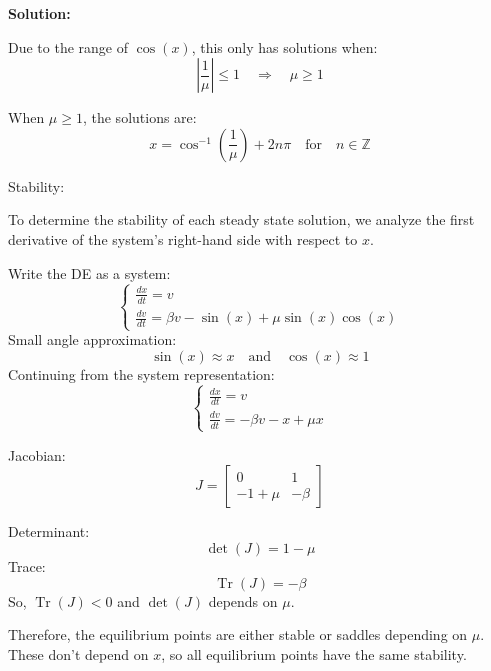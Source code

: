 \documentclass[12pt]{article}
\DeclareMathOperator{\Tr}{Tr}
\newenvironment{solution}{
    \textbf{Solution:}
    
}{
    
    \vspace{2em}
}
\begin{document}
\begin{solution}
       Due to the range of \(\cos(x)\), this only has solutions when:
       \[
       \left| \frac{1}{\mu} \right| \leq 1 \quad \Rightarrow \quad \mu \geq 1
       \]
       
       When \(\mu \geq 1\), the solutions are:
       \[
       x = \cos^{-1}\left( \frac{1}{\mu} \right) + 2n\pi \quad \text{for} \quad n \in \mathbb{Z}
       \]
    
    Stability:
    
    To determine the stability of each steady state solution, we analyze the first derivative of the system's right-hand side with respect to \( x \).
    
    Write the DE as a system:
    \[
    \begin{cases}
    \frac{dx}{dt} = v \\
    \frac{dv}{dt} = \beta v - \sin(x) + \mu \sin(x) \cos(x)
    \end{cases}
    \]
    Small angle approximation:
    \[
    \sin(x) \approx x \quad \text{and} \quad \cos(x) \approx 1
    \]
    Continuing from the system representation:
    \[
    \begin{cases}
    \frac{dx}{dt} = v \\
    \frac{dv}{dt} = -\beta v - x + \mu x
    \end{cases}
    \]
    
    Jacobian:
    \[
      J = \begin{bmatrix}
        0 & 1 \\
        -1 + \mu & -\beta
        \end{bmatrix}
    \]
    
    Determinant:
        \[
        \det(J) = 1 - \mu
        \]
        Trace:
        \[
        \Tr(J) = -\beta
        \]
        So, \(\Tr(J) < 0\) and \(\det(J)\) depends on \(\mu\).

        Therefore, the equilibrium points are either stable or saddles depending on \(\mu\). These don't depend on \(x\), so all equilibrium points have the same stability.
    

    
\end{solution}
\end{document}
